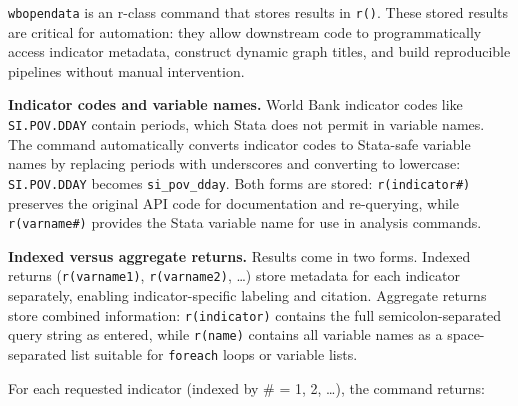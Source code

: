 \documentclass[bib]{statapress}
\begin{document}
\texttt{wbopendata} is an r-class command that stores results in \texttt{r()}. These stored results are critical for automation: they allow downstream code to programmatically access indicator metadata, construct dynamic graph titles, and build reproducible pipelines without manual intervention.

\noindent\textbf{Indicator codes and variable names.}
World Bank indicator codes like \texttt{SI.POV.DDAY} contain periods,
which Stata does not permit in variable names. The command automatically
converts indicator codes to Stata-safe variable names by replacing periods
with underscores and converting to lowercase: \texttt{SI.POV.DDAY} becomes
\texttt{si\_pov\_dday}.
Both forms are stored: \texttt{r(indicator\#)} preserves the original API code for documentation and re-querying, while \texttt{r(varname\#)} provides the Stata variable name for use in analysis commands.

\textbf{Indexed versus aggregate returns.} Results come in two forms. Indexed returns (\texttt{r(varname1)}, \texttt{r(varname2)}, \ldots) store metadata for each indicator separately, enabling indicator-specific labeling and citation. Aggregate returns store combined information: \texttt{r(indicator)} contains the full semicolon-separated query string as entered, while \texttt{r(name)} contains all variable names as a space-separated list suitable for \texttt{foreach} loops or variable lists.

For each requested indicator (indexed by \# = 1, 2, \ldots), the command returns:
\end{document}
